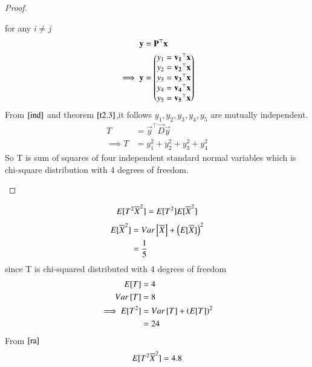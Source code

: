 \documentclass[journal,12pt,twocolumn]{IEEEtran}
\begin{document}
\begin{proof}
\begin{enumerate}
    for any $i\neq j$
    \begin{align}
     \mathbf{y}&=\mathbf{P}^{\top}\mathbf{x}\\
     \implies 
        \mathbf{y}&=\begin{pmatrix}y_1=\mathbf{v_1}^{\top}\mathbf{x}\\
                       y_2=\mathbf{v_2}^{\top}\mathbf{x}\\
                       y_3=\mathbf{v_3}^{\top}\mathbf{x}\\
                       y_4=\mathbf{v_4}^{\top}\mathbf{x}\\
                       y_5=\mathbf{v_5}^{\top}\mathbf{x}\end{pmatrix}\\
    \end{align}
    From $\eqref{ind}$ and theorem $\ref{t2.3}$,it follows $y_1,y_2,y_3,y_4,y_5$ are mutually independent.
    \begin{align}
    T&=\vec{y}^{\top}\vec{D}\vec{y}\\
        \implies
         T&=y_1^2+y_2^2+y_3^2+y_4^2 
    \end{align}
    So T is sum of squares of four independent standard normal variables which is chi-square distribution with 4 degrees of freedom.
    \end{enumerate}
\end{proof}
\begin{align}
    E[ T^2\overline{X}^2 ]=E[ T^2 ]E[ \overline{X}^2 ]\label{ra}
\end{align}
\begin{align}
    E[ \overline{X}^2 ]&=Var{}\left[\overline{X}\right]+\left(E[ \overline{X} ]\right)^2\\
    &=\frac{1}{5}
\end{align}
 since T is chi-squared distributed with 4 degrees of freedom
 \begin{align}
     E[ T ]&=4\\
     Var{}\left[T\right]&=8\\
     \implies E[ T^2 ]&=Var{}\left[T\right]+\left(E[ T ]\right)^2\\
    &=24
 \end{align}
 From $\eqref{ra}$
\begin{align}
    E[ T^2\overline{X}^2 ]=4.8
\end{align}
\end{document}
